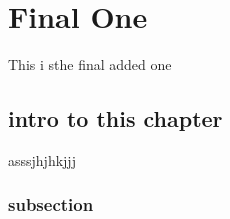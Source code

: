 \chapter{Final One}

This i sthe final added one

\section{intro to this chapter}

asssjhjhkjjj
\subsection{subsection}